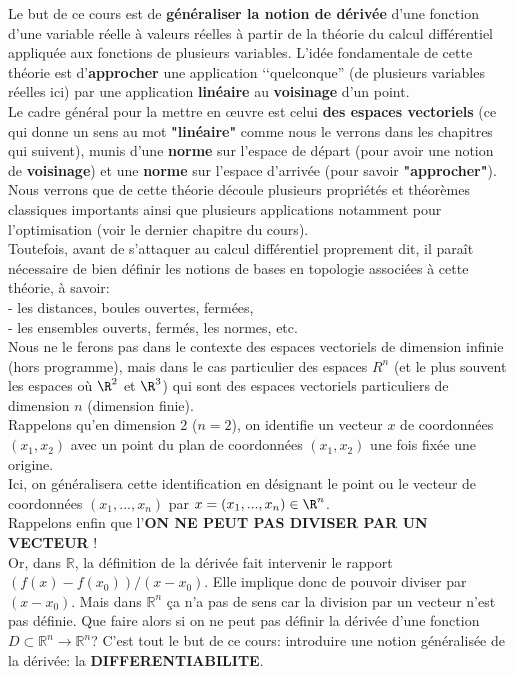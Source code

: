 \documentclass[class=report,crop=false]{standalone}
\begin{document}
 Le but de ce cours est de \textbf{généraliser la notion de dérivée} d'une fonction
d'une variable réelle à valeurs réelles à partir de la théorie du calcul différentiel appliquée aux fonctions
de plusieurs variables. L'idée fondamentale de cette théorie est d'\textbf{approcher} une application ‘‘quelconque'' (de plusieurs variables réelles ici) par une application \textbf{ linéaire} au \textbf{voisinage}
d'un point.\\ 
$ $\\
Le cadre général
pour la mettre en œuvre est celui \textbf{des espaces vectoriels} (ce qui donne un sens au mot \textbf{"linéaire"} comme nous le verrons dans les chapitres qui suivent),
munis d'une \textbf{norme} sur l'espace de départ (pour avoir une notion de \textbf{voisinage}) et une \textbf{norme}
sur l'espace d'arrivée (pour savoir \textbf{"approcher"}).
\\
Nous verrons que de cette théorie
découle plusieurs propriétés et théorèmes classiques importants ainsi que plusieurs applications notamment pour l'optimisation (voir le dernier chapitre du cours). \\
$ $\\
Toutefois,  avant de s'attaquer au calcul différentiel proprement dit, il paraît nécessaire de bien
définir les notions de bases en topologie associées à cette théorie, à savoir:\\
- les distances, boules ouvertes, fermées,\\
- les ensembles ouverts, fermés, les normes, etc. 
$ $\\
 Nous ne le ferons pas dans le contexte des espaces
vectoriels de dimension infinie (hors programme), mais dans le cas particulier des espaces $R^n$ (et le plus souvent les espaces où $\R^2$ et $\R^3$)
qui sont des espaces vectoriels particuliers de dimension $n$ (dimension finie). \\
Rappelons qu'en dimension 2 ($n=2$), on identifie un vecteur $x$ de coordonnées $(x_1,x_2)$
avec un point du plan de coordonnées $(x_1,x_2)$ une fois fixée une origine. \\
Ici, on généralisera cette identification en désignant le point ou le vecteur de coordonnées 
  $(x_1,...,x_n)$ par $x=(x_1,...,x_n)\in \R^n$. \\
  $ $ \\
Rappelons enfin que l'\textbf{ON NE PEUT PAS DIVISER PAR UN VECTEUR}  ! \\
 Or, dans $\mathbb{R}$, la d\'efinition de la d\'eriv\'ee fait
intervenir le rapport $(f(x)-f(x_0))/(x-x_0)$. Elle
implique donc de pouvoir diviser par $(x-x_0)$. 
Mais dans $\mathbb{R}^n$  \c{c}a n'a pas de sens car la division par un vecteur
n'est pas d\'efinie. Que faire alors si on ne peut pas d\'efinir la d\'eriv\'ee
d'une fonction  $D\subset\mathbb{R}^n\rightarrow\mathbb{R}^n$? 
C'est tout le but de ce cours: introduire une  notion généralisée de la dérivée:  la  \textbf{DIFFERENTIABILITE}.
\end{document}

